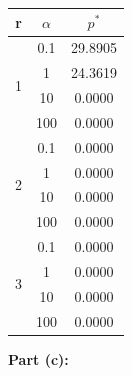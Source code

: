 \documentclass[11pt]{article}
\begin{document}
\begin{homeworkProblem}
    \begin{table}[h!]
        \centering
        \begin{tabular}{|c|c|c|}
            \hline
            r                  & $\alpha$ & $p^*$   \\
            \hline
            \multirow{4}{*}{1} & 0.1      & 29.8905 \\
                               & 1        & 24.3619 \\
                               & 10       & 0.0000  \\
                               & 100      & 0.0000  \\
            \hline
            \multirow{4}{*}{2} & 0.1      & 0.0000  \\
                               & 1        & 0.0000  \\
                               & 10       & 0.0000  \\
                               & 100      & 0.0000  \\
            \hline
            \multirow{4}{*}{3} & 0.1      & 0.0000  \\
                               & 1        & 0.0000  \\
                               & 10       & 0.0000  \\
                               & 100      & 0.0000  \\
            \hline
        \end{tabular}

    \end{table}

    \pagebreak

    \textbf{Part (c):}


\end{homeworkProblem}
\end{document}
